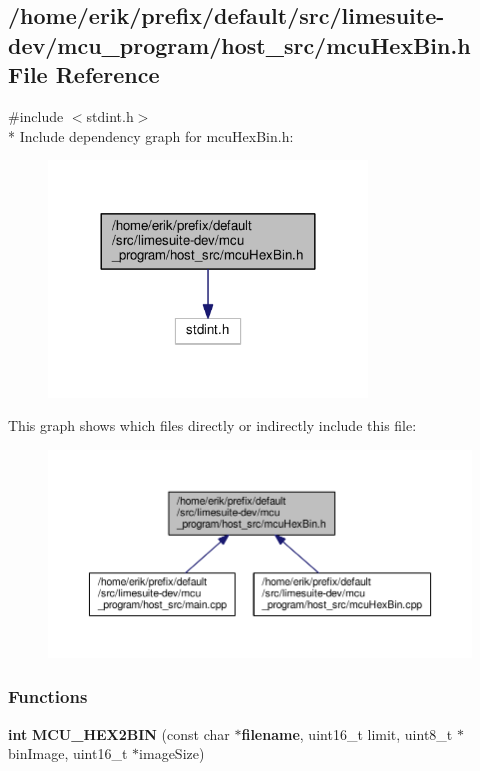 \subsection{/home/erik/prefix/default/src/limesuite-\/dev/mcu\+\_\+program/host\+\_\+src/mcu\+Hex\+Bin.h File Reference}
\label{mcuHexBin_8h}
{\ttfamily \#include $<$stdint.\+h$>$}\\*
Include dependency graph for mcu\+Hex\+Bin.\+h\+:
\nopagebreak
\begin{figure}[H]
\begin{center}
\leavevmode
\includegraphics[width=240pt]{de/d46/mcuHexBin_8h__incl}
\end{center}
\end{figure}
This graph shows which files directly or indirectly include this file\+:
\nopagebreak
\begin{figure}[H]
\begin{center}
\leavevmode
\includegraphics[width=350pt]{d0/dd7/mcuHexBin_8h__dep__incl}
\end{center}
\end{figure}
\subsubsection*{Functions}
\begin{DoxyCompactItemize}
\item 
{\bf int} {\bf M\+C\+U\+\_\+\+H\+E\+X2\+B\+IN} (const char $\ast${\bf filename}, uint16\+\_\+t limit, uint8\+\_\+t $\ast$bin\+Image, uint16\+\_\+t $\ast$image\+Size)
\end{DoxyCompactItemize}


